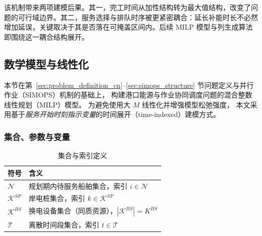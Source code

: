 \documentclass[UTF8, a4paper, 12pt]{ctexart}
\theoremstyle{plain}
\theoremstyle{definition}
\theoremstyle{remark}
\begin{document}
该机制带来两项建模后果。其一，完工时间从加性结构转为最大值结构，改变了问题的可行域边界。其二，服务选择与排队时序被更紧密耦合：延长补能时长不必然增加延误，关键取决于其是否落在可掩盖区间内。后续 MILP 模型与列生成算法即围绕这一耦合结构展开。

\subsection{数学模型与线性化}
\label{sec:model_formulation}

本节在第~\ref{sec:problem_definition_cn}--\ref{sec:simops_structure} 节问题定义与并行作业（SIMOPS）机制的基础上，
构建港口能源与作业协同调度问题的混合整数线性规划（MILP）模型。
为避免使用大 $M$ 线性化并增强模型松弛强度，
本文采用基于\emph{服务开始时刻指示变量}的时间展开（time-indexed）建模方式。
\subsubsection{集合、参数与变量}

\begin{table}[!htbp]
\centering
\caption{集合与索引定义}
\begin{tabular}{ll}
\toprule
符号 & 含义 \\
\midrule
$\mathcal{N}$ & 规划期内待服务船舶集合，索引 $i \in \mathcal{N}$ \\
$\mathcal{K}^{SP}$ & 岸电桩集合，索引 $k \in \mathcal{K}^{SP}$ \\
$\mathcal{K}^{BS}$ & 换电设备集合（同质资源），$|\mathcal{K}^{BS}| = K^{BS}$ \\
$\mathcal{T}$ & 离散时间段集合，索引 $t \in \mathcal{T}$ \\
\bottomrule
\end{tabular}
\end{table}
\end{document}
